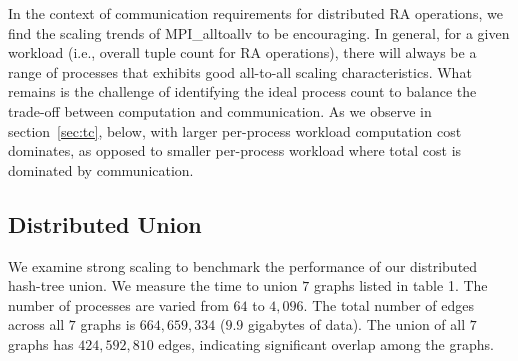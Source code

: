 In the context of communication requirements for distributed RA operations, we find the scaling trends of MPI\_alltoallv to be encouraging. In general, for a given workload (i.e., overall tuple count for RA operations), there will always be a range of processes that exhibits good all-to-all scaling characteristics. What remains is the challenge of identifying the ideal process count to balance the trade-off between computation and communication. As we observe in section~\ref{sec:tc}, below, with larger per-process workload computation cost dominates, as opposed to smaller per-process workload where total cost is dominated by communication. 



\subsection{Distributed Union}
\label{sec:union}


We examine strong scaling to benchmark the performance of our distributed hash-tree union. We measure the time to union $7$ graphs listed in table 1. The number of processes are varied from $64$ to $4,\!096$. The total number of edges across all $7$ graphs is $664,\!659,\!334$ ($9.9$ gigabytes of data). The union of all $7$ graphs has $424,\!592,\!810$ edges, indicating significant overlap among the graphs.

